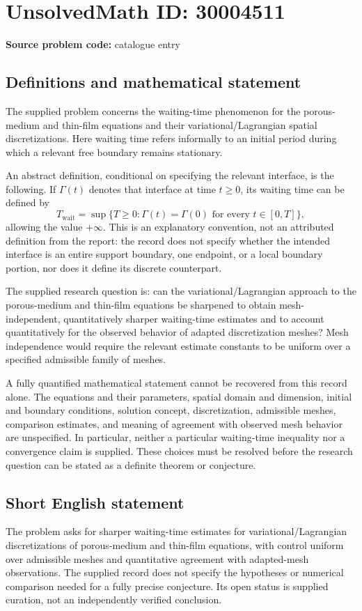 \documentclass[11pt]{article}
\begin{document}
\section*{UnsolvedMath ID: 30004511}
\textbf{Source problem code:} catalogue entry
\subsection{Definitions and mathematical statement}
The supplied problem concerns the waiting-time phenomenon for the porous-medium and thin-film equations and their variational/Lagrangian spatial discretizations. Here waiting time refers informally to an initial period during which a relevant free boundary remains stationary.

An abstract definition, conditional on specifying the relevant interface, is the following. If \(\Gamma(t)\) denotes that interface at time \(t\geq 0\), its waiting time can be defined by
\[
T_{\mathrm{wait}}=\sup\bigl\{T\geq 0: \Gamma(t)=\Gamma(0)\text{ for every }t\in[0,T]\bigr\},
\]
allowing the value \(+\infty\). This is an explanatory convention, not an attributed definition from the report: the record does not specify whether the intended interface is an entire support boundary, one endpoint, or a local boundary portion, nor does it define its discrete counterpart.

The supplied research question is: can the variational/Lagrangian approach to the porous-medium and thin-film equations be sharpened to obtain mesh-independent, quantitatively sharper waiting-time estimates and to account quantitatively for the observed behavior of adapted discretization meshes? Mesh independence would require the relevant estimate constants to be uniform over a specified admissible family of meshes.

A fully quantified mathematical statement cannot be recovered from this record alone. The equations and their parameters, spatial domain and dimension, initial and boundary conditions, solution concept, discretization, admissible meshes, comparison estimates, and meaning of agreement with observed mesh behavior are unspecified. In particular, neither a particular waiting-time inequality nor a convergence claim is supplied. These choices must be resolved before the research question can be stated as a definite theorem or conjecture.
\subsection{Short English statement}
The problem asks for sharper waiting-time estimates for variational/Lagrangian discretizations of porous-medium and thin-film equations, with control uniform over admissible meshes and quantitative agreement with adapted-mesh observations. The supplied record does not specify the hypotheses or numerical comparison needed for a fully precise conjecture. Its open status is supplied curation, not an independently verified conclusion.
\end{document}
